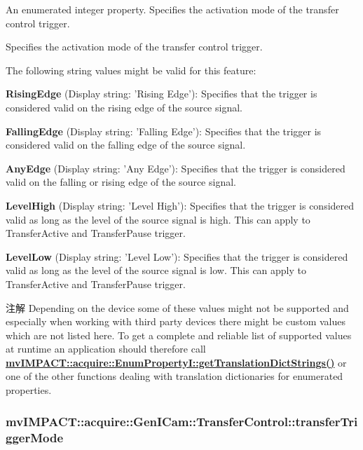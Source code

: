 An enumerated integer property. Specifies the activation mode of the transfer control trigger. 

Specifies the activation mode of the transfer control trigger.

The following string values might be valid for this feature\+:
\begin{DoxyItemize}
\item {\bfseries Rising\+Edge} (Display string\+: 'Rising Edge')\+: Specifies that the trigger is considered valid on the rising edge of the source signal.
\item {\bfseries Falling\+Edge} (Display string\+: 'Falling Edge')\+: Specifies that the trigger is considered valid on the falling edge of the source signal.
\item {\bfseries Any\+Edge} (Display string\+: 'Any Edge')\+: Specifies that the trigger is considered valid on the falling or rising edge of the source signal.
\item {\bfseries Level\+High} (Display string\+: 'Level High')\+: Specifies that the trigger is considered valid as long as the level of the source signal is high. This can apply to Transfer\+Active and Transfer\+Pause trigger.
\item {\bfseries Level\+Low} (Display string\+: 'Level Low')\+: Specifies that the trigger is considered valid as long as the level of the source signal is low. This can apply to Transfer\+Active and Transfer\+Pause trigger.
\end{DoxyItemize}

\begin{DoxyNote}{注解}
Depending on the device some of these values might not be supported and especially when working with third party devices there might be custom values which are not listed here. To get a complete and reliable list of supported values at runtime an application should therefore call {\bfseries \hyperlink{classmv_i_m_p_a_c_t_1_1acquire_1_1_enum_property_i_a0ba6ccbf5ee69784d5d0b537924d26b6}{mv\+I\+M\+P\+A\+C\+T\+::acquire\+::\+Enum\+Property\+I\+::get\+Translation\+Dict\+Strings()}} or one of the other functions dealing with translation dictionaries for enumerated properties. 
\end{DoxyNote}
\hypertarget{classmv_i_m_p_a_c_t_1_1acquire_1_1_gen_i_cam_1_1_transfer_control_ac2953e7216e702179e8277aa4355ba31}{
\subsubsection[{transfer\+Trigger\+Mode}]{ mv\+I\+M\+P\+A\+C\+T\+::acquire\+::\+Gen\+I\+Cam\+::\+Transfer\+Control\+::transfer\+Trigger\+Mode}}\label{classmv_i_m_p_a_c_t_1_1acquire_1_1_gen_i_cam_1_1_transfer_control_ac2953e7216e702179e8277aa4355ba31}


